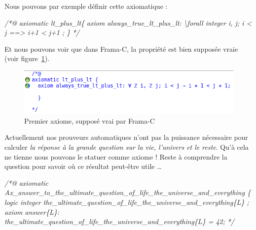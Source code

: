 \documentclass[12pt,francais,]{scrbook}
\newenvironment{Shaded}{}{}
\newcommand{\CommentTok}[1]{\textcolor[rgb]{0.38,0.63,0.69}{\textit{{#1}}}}
\newcommand{\CommentTokAlt}[1]{\textcolor[rgb]{0.18,0.33,0.39}{\textit{{#1}}}}
\newenvironment{zdssecretblock}[1]{%
  \tcolorbox[beamer,%
    noparskip,breakable,
    colback=LightGray,colframe=DarkGray,%
    colbacklower=LightGray,%
    title=#1]
}{\endtcolorbox}
\begin{document}
Nous pouvons par exemple définir cette axiomatique :

\begin{footnotesize}\begin{Shaded}
\begin{Highlighting}[]
\CommentTok{/*@}
\CommentTok{  axiomatic lt_plus_lt\{}
\CommentTok{    axiom always_true_lt_plus_lt:}
\CommentTok{      \textbackslash{}forall integer i, j; i < j ==> i+1 < j+1 ;}
\CommentTok{  \}}
\CommentTok{*/}
\end{Highlighting}
\end{Shaded}\end{footnotesize}

Et nous pouvons voir que dans Frama-C, la propriété est bien supposée
vraie (voir figure~\ref{fig:5-1-1-fst-axiom}).

\begin{figure}[htbp]
\centering
\includegraphics[scale=0.5]{5-1-1-premier-axiome.png}
\caption{Premier axiome, supposé vrai par Frama-C}
\label{fig:5-1-1-fst-axiom}
\end{figure}

\begin{zdssecretblock}{Hors sujet}
  Actuellement nos prouveurs automatiques
  n'ont pas la puissance nécessaire pour calculer \emph{la
    réponse à la grande question sur la vie, l'univers et le 
    reste}. Qu'à cela ne tienne nous pouvons le statuer comme axiome ! Reste
  à comprendre la question pour savoir où ce résultat peut-être
  utile \ldots{}
  \begin{footnotesize}\begin{Shaded}
\begin{Highlighting}[]
\CommentTokAlt{/*@}
\CommentTokAlt{  axiomatic Ax_answer_to_the_ultimate_question_of_life_the_universe_and_everything \{}
\CommentTokAlt{    logic integer the_ultimate_question_of_life_the_universe_and_everything\{L\} ;}
\CommentTokAlt{}
\CommentTokAlt{    axiom answer\{L\}:}
\CommentTokAlt{      the_ultimate_question_of_life_the_universe_and_everything\{L\} = 42;}
\CommentTokAlt{}
\CommentTokAlt{*/}
\end{Highlighting}
    \end{Shaded}
  \end{footnotesize}
\end{zdssecretblock}
\end{document}
